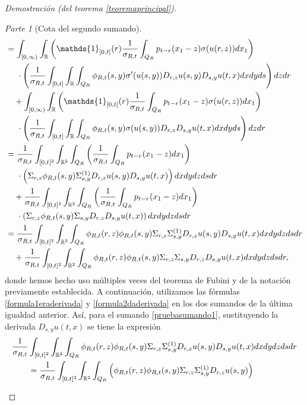 \documentclass[letterpaper,twoside,12pt]{book}
\newcommand{\R}{\mathbb{R}}
\newcommand{\1}{\mathds{1}}
\theoremstyle{definition}
\theoremstyle{definition}
\theoremstyle{remark}
\newtheorem{proofpart}{Parte}
\theoremstyle{definition}
\theoremstyle{definition}
\theoremstyle{definition}
\theoremstyle{definition}
\theoremstyle{definition}
\begin{document}
\begin{proof}[Demostración (del teorema \ref{teoremaprincipal})]
\begin{proofpart}[Cota del segundo sumando]
\begin{align}
   &=\int_{[0,\infty)}\int_\R \left(\1_{[0,t]}(r)\frac{1}{\sigma_{R,t}}\int_{Q_R}p_{t-r}(x_1-z)\sigma(u(r,z))dx_1\right)\notag\\
   &\ \ \ \ \cdot \left(\frac{1}{\sigma_{R,t}}\int_{[0,t]}\int_\R \int_{Q_R}\phi_{R,t}(s,y)\sigma'(u(s,y))D_{r,z}u(s,y)D_{s,y}u(t,x)dx dy ds\right)dz dr\notag\\
   &\ \ \ +\int_{[0,\infty)}\int_\R \left(\1_{[0,t]}(r)\frac{1}{\sigma_{R,t}}\int_{Q_R}p_{t-r}(x_1-z)\sigma(u(r,z))dx_1\right)\notag\\
   &\ \ \ \ \cdot\left(\frac{1}{\sigma_{R,t}}\int_{[0,t]}\int_\R \int_{Q_R}\phi_{R,t}(s,y)\sigma(u(s,y))D_{r,z}D_{s,y}u(t,x)dx dy ds\right)dz dr\notag\\
   &=\frac{1}{\sigma_{R,t}}\int_{[0,t]^2}\int_{\R^2}\int_{Q_R}\left(\frac{1}{\sigma_{R,t}}\int_{Q_R}p_{t-r}(x_1-z)dx_1\right)\notag\\
   &\ \ \ \ \cdot \left(\Sigma_{r,z}\phi_{R,t}(s,y)\Sigma^{(1)}_{s,y}D_{r,z}u(s,y)D_{s,y}u(t,x)\right) dx dy dz ds dr\notag\\
   &\ \ \ +\frac{1}{\sigma_{R,t}}\int_{[0,t]^2}\int_{\R^2}\int_{Q_R} \left(\frac{1}{\sigma_{R,t}}\int_{Q_R}p_{t-r}(x_1-z)dx_1\right)\notag\\
   &\ \ \ \ \cdot\left(\Sigma_{r,z}\phi_{R,t}(s,y)\Sigma_{s,y}D_{r,z}D_{s,y}u(t,x)\right)dx dy dz ds dr\notag\\
   &=\frac{1}{\sigma_{R,t}}\int_{[0,t]^2}\int_{\R^2}\int_{Q_R}\phi_{R,t}(r,z)\phi_{R,t}(s,y)\Sigma_{r,z}\Sigma^{(1)}_{s,y}D_{r,z}u(s,y)D_{s,y}u(t,x)dx dy dz ds dr\label{pruebasumando1}\\ 
   &\ \ \ +\frac{1}{\sigma_{R,t}}\int_{[0,t]^2}\int_{\R^2}\int_{Q_R}\phi_{R,t}(r,z)\phi_{R,t}(s,y)\Sigma_{r,z}\Sigma_{s,y}D_{r,z}D_{s,y}u(t,x)dx dy dz ds dr,\label{pruebasumando2}
\end{align}
   donde hemos hecho uso múltiples veces del teorema de Fubini y de la notación previamente establecida. A continuación, utilizamos las fórmulas \eqref{formula1eraderivada} y \eqref{formula2daderivada} en los dos sumandos de la última igualdad anterior. Así, para el sumando \eqref{pruebasumando1}, sustituyendo la derivada $D_{s,y}u(t,x)$ se tiene la expresión
   \begin{align}
      \frac{1}{\sigma_{R,t}}&\int_{[0,t]^2}\int_{\R^2}\int_{Q_R}\phi_{R,t}(r,z)\phi_{R,t}(s,y)\Sigma_{r,z}\Sigma^{(1)}_{s,y}D_{r,z}u(s,y)D_{s,y}u(t,x)dx dy dz ds dr\notag\\
      &=\frac{1}{\sigma_{R,t}}\int_{[0,t]^2}\int_{\R^2}\int_{Q_R}\left(\phi_{R,t}(r,z)\phi_{R,t}(s,y)\Sigma_{r,z}\Sigma^{(1)}_{s,y}D_{r,z}u(s,y)\right)\notag\\

\end{align}
\end{proofpart}
\end{proof}
\end{document}
